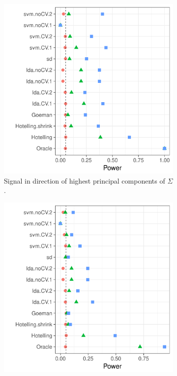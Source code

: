\documentclass[12pt,a4paper]{article}
\begin{document}
\begin{figure}[h]
	\centering
	\caption{Arbitrary Correlation. 
		$\Sigma=D^{-1} R D^{-1}$ where $D$ is diagonal with $D_{jj}=\sqrt{R_{jj}}$, and $R$ is a Gaussian $p\times p$ random matrix with independent $\mathcal{N}(0,1)$ entries.
	}
	\begin{subfigure}[t]{.3\textwidth}
		\centering
		\includegraphics[width=1\linewidth]{"art/file18"}
		\caption{Signal in direction of highest principal components of $\Sigma$.} 
		\label{fig:dependence_31}
	\end{subfigure}
	\begin{subfigure}[t]{.3\textwidth}
		\centering
		\includegraphics[width=1\linewidth]{"art/file17"}

\end{subfigure}
\end{figure}
\end{document}
